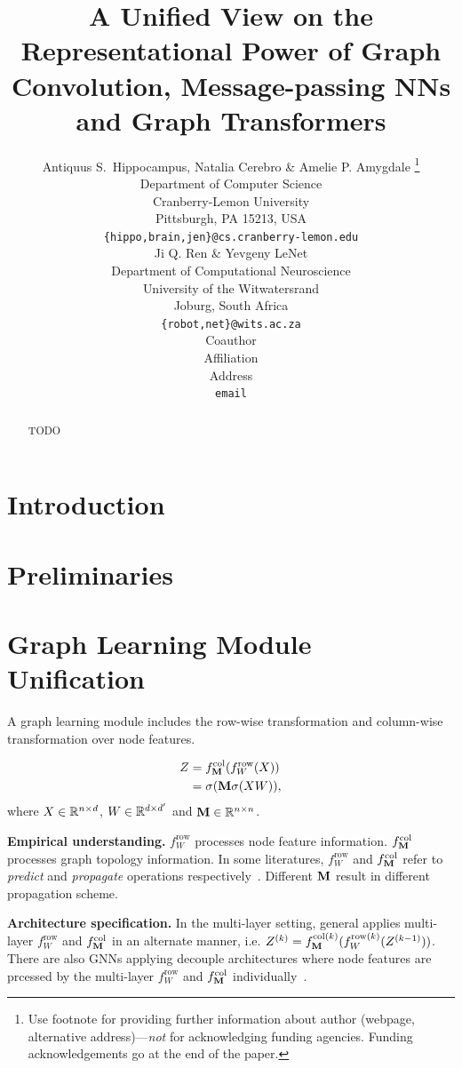 \documentclass{article} %
\title{A Unified View on the Representational Power of Graph Convolution, Message-passing NNs and Graph Transformers}
\author{Antiquus S.~Hippocampus, Natalia Cerebro \& Amelie P. Amygdale \thanks{ Use footnote for providing further information
		about author (webpage, alternative address)---\emph{not} for acknowledging
		funding agencies.  Funding acknowledgements go at the end of the paper.} \\
	Department of Computer Science\\
	Cranberry-Lemon University\\
	Pittsburgh, PA 15213, USA \\
	\texttt{\{hippo,brain,jen\}@cs.cranberry-lemon.edu} \\
	\And
	Ji Q. Ren \& Yevgeny LeNet \\
	Department of Computational Neuroscience \\
	University of the Witwatersrand \\
	Joburg, South Africa \\
	\texttt{\{robot,net\}@wits.ac.za} \\
	\AND
	Coauthor \\
	Affiliation \\
	Address \\
	\texttt{email}
}
\begin{document}
\maketitle

\begin{abstract}
	TODO
\end{abstract}

\section{Introduction}

\section{Preliminaries}

\section{Graph Learning Module Unification}

A graph learning module includes the row-wise transformation and column-wise transformation over node features.

\begin{equation}
	\label{equ:uni_grl}
	\begin{aligned}
		Z&=f_{{\mathbf{M}}}^{\mathrm{col}}(f_W^{\mathrm{row}}(X))\\
		&=\sigma({\mathbf{M}}\sigma(XW)),
	\end{aligned}
\end{equation}
where $X\in{\mathbb{R}}^{n\times d}$, $W\in{\mathbb{R}}^{d\times d^{\prime}}$ and ${\mathbf{M}}\in{\mathbb{R}}^{n\times n}$.


\textbf{Empirical understanding.}
$f_W^{\mathrm{row}}$ processes node feature information.
$f_{{\mathbf{M}}}^{\mathrm{col}}$ processes graph topology information.
In some literatures, $f_W^{\mathrm{row}}$ and $f_{{\mathbf{M}}}^{\mathrm{col}}$ refer to \emph{predict} and \emph{propagate} operations respectively~\citep{klicpera_predict_2019}.
Different ${\mathbf{M}}$ result in different propagation scheme.

\textbf{Architecture specification.}
In the multi-layer setting, general applies multi-layer $f_W^{\mathrm{row}}$ and $f_{{\mathbf{M}}}^{\mathrm{col}}$ in an alternate manner, i.e. $Z^{(k)}=f_{{\mathbf{M}}}^{\mathrm{col}(k)}(f_W^{\mathrm{row}(k)}(Z^{(k-1)}))$.
There are also GNNs applying decouple architectures where node features are prcessed by the multi-layer $f_W^{\mathrm{row}}$ and $f_{{\mathbf{M}}}^{\mathrm{col}}$ individually~\citep{klicpera_predict_2019,pmlr-v97-wu19e,klicpera_predict_2019,liu2020towards,zhu2020simple,zhang2021litegem}.
\end{document}
